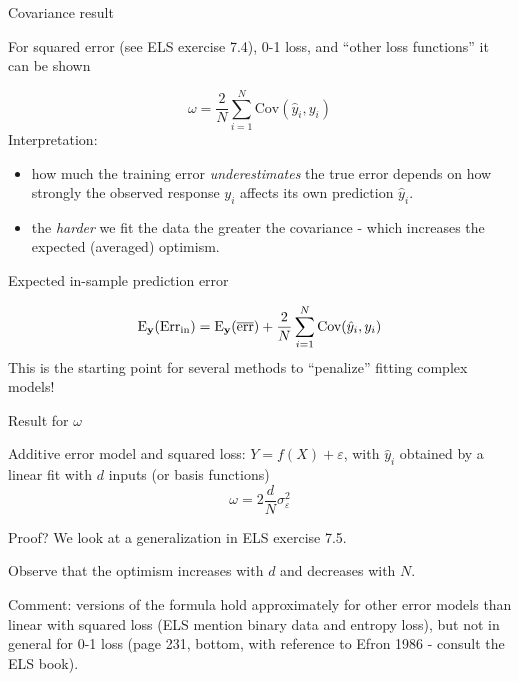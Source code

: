 \documentclass[
  ignorenonframetext,
]{beamer}
\providecommand{\tightlist}{%
  \setlength{\itemsep}{0pt}\setlength{\parskip}{0pt}}
\begin{document}
\begin{frame}

\begin{block}{Covariance result}

For squared error (see ELS exercise 7.4), 0-1 loss, and ``other loss
functions'' it can be shown

\[ \omega=\frac{2}{N} \sum_{i=1}^N \text{Cov}(\hat{y}_i,y_i)\]
Interpretation:

\begin{itemize}
\tightlist
\item
  how much the training error \emph{underestimates} the true error
  depends on how strongly the observed response \(y_i\) affects its own
  prediction \(\hat{y}_i\).
\item
  the \emph{harder} we fit the data the greater the covariance - which
  increases the expected (averaged) optimism.
\end{itemize}

\end{block}

\end{frame}

\begin{frame}

\begin{block}{Expected in-sample prediction error}

\[ \text{E}_{\bf y}(\text{Err}_{\text{in}})=\text{E}_{\bf y}(\overline{\text{err}})+\frac{2}{N} \sum_{i=1}^N \text{Cov}(\hat{y}_i,y_i)\]
This is the starting point for several methods to ``penalize'' fitting
complex models!

\end{block}

\end{frame}

\begin{frame}

\begin{block}{Result for \(\omega\)}

Additive error model and squared loss: \(Y=f(X)+\varepsilon\), with
\(\hat{y}_i\) obtained by a linear fit with \(d\) inputs (or basis
functions) \[\omega=2 \frac{d}{N}\sigma_{\varepsilon}^2\]

Proof? We look at a generalization in ELS exercise 7.5.

Observe that the optimism increases with \(d\) and decreases with \(N\).

Comment: versions of the formula hold approximately for other error
models than linear with squared loss (ELS mention binary data and
entropy loss), but not in general for 0-1 loss (page 231, bottom, with
reference to Efron 1986 - consult the ELS book).

\end{block}

\end{frame}
\end{document}
